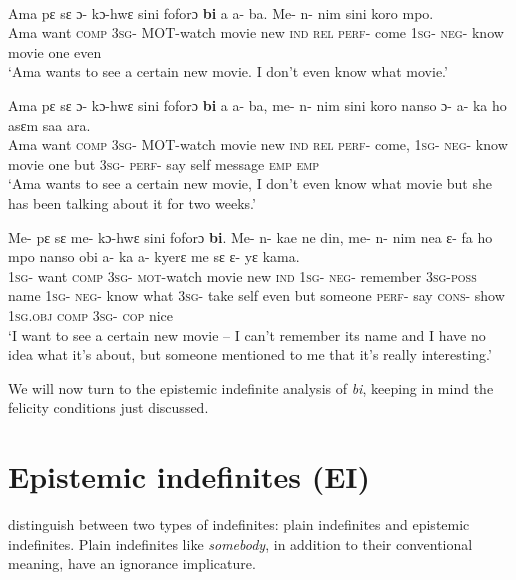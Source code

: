 \documentclass[output=paper,modfonts,nonflat,draftmode]{langsci/langscibook}
\begin{document}
\pagebreak
\ea
{}\\
\ea\label{owusu:ex20}
\gll Ama pε sε ɔ- kɔ-hwε sini foforɔ \textbf{bi} a a- ba. Me- n- nim sini koro mpo.\\
Ama want \textsc{comp} \textsc{3sg}- \textsc{MOT}-watch movie new \textsc{ind} \textsc{rel} \textsc{perf}- come \textsc{1sg}- \textsc{neg}- know movie one even \\
\glt `Ama wants to see a certain new movie. I don't even know what movie.'

\ex\label{owusu:ex21}
 \gll Ama pε sε ɔ- kɔ-hwε sini foforɔ \textbf{bi} a a- ba, me- n- nim sini koro nanso ɔ- a- ka ho asεm saa ara.\\
Ama want \textsc{comp} \textsc{3sg}- \textsc{MOT}-watch movie new \textsc{ind} \textsc{rel} \textsc{perf}- come, \textsc{1sg}- \textsc{neg}- know movie one but \textsc{3sg}- \textsc{perf}- say self message \textsc{emp} \textsc{emp} \\
\glt `Ama wants to see a certain new movie, I don't even know what movie but she has been talking about it for two weeks.'

\ex\label{owusu:ex20a}
\gll Me- pε sε me- kɔ-hwε sini foforɔ \textbf{bi}. Me- n- kae ne din, me- n- nim nea ε- fa ho mpo nanso obi a- ka a- kyerε me sε ε- yε kama.\\
\textsc{1sg}- want \textsc{comp} \textsc{3sg}- \textsc{mot}-watch movie new \textsc{ind} \textsc{1sg}- \textsc{neg}- remember \textsc{3sg}-\textsc{poss} name \textsc{1sg}- \textsc{neg}- know what \textsc{3sg}- take self even but someone \textsc{perf}- say \textsc{cons}- show \textsc{1sg}.\textsc{obj} \textsc{comp} \textsc{3sg}- \textsc{cop} nice\\
\glt `I want to see a certain new movie – I can’t remember its name and I have no idea what it’s about, but someone mentioned to me that it’s really interesting.'
\z\z

We will now turn to the epistemic indefinite analysis of \emph{bi}, keeping in mind the felicity conditions just discussed.

\section{Epistemic indefinites (EI)}\label{sec:owusu:3}

\citet{AloniPort2015} distinguish between two types of indefinites: plain indefinites and epistemic indefinites. Plain indefinites like \emph{somebody}, in addition to their conventional meaning, have an ignorance implicature.
\end{document}
